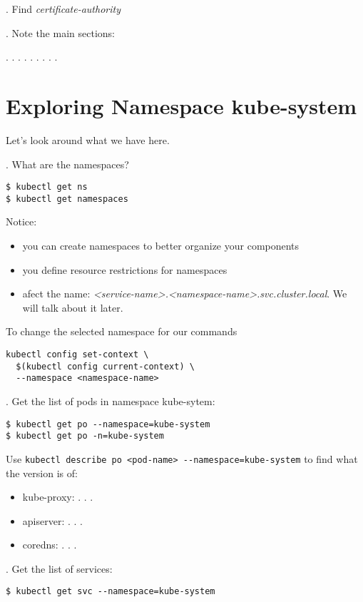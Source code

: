 \documentclass[12pt, letterpaper]{article}
\begin{document}
. Find \textit{certificate-authority}

. Note the main sections:

   . . .
   . . .
   . . .

%
%
%
\section{Exploring Namespace kube-system}

Let's look around what we have here.

. What are the namespaces?

\begin{verbatim}
$ kubectl get ns
$ kubectl get namespaces
\end{verbatim}

Notice:
\begin{itemize}
    \item you can create namespaces to better organize your components
    \item you define resource restrictions for namespaces
    \item afect the name: \textit{<service-name>.<namespace-name>.svc.cluster.local}. We will talk about it later.
\end{itemize}

To change the selected namespace for our commands

\begin{verbatim}
kubectl config set-context \
  $(kubectl config current-context) \
  --namespace <namespace-name>
\end{verbatim}

. Get the list of pods in namespace kube-sytem:

\begin{verbatim}
$ kubectl get po --namespace=kube-system
$ kubectl get po -n=kube-system
\end{verbatim}

Use \verb|kubectl describe po <pod-name> --namespace=kube-system| to find what the version is of:
\begin{itemize}
    \item kube-proxy: . . .
    \item apiserver: . . .
    \item coredns: . . .
\end{itemize}

. Get the list of services:

\begin{verbatim}
$ kubectl get svc --namespace=kube-system
\end{verbatim}
\end{document}
